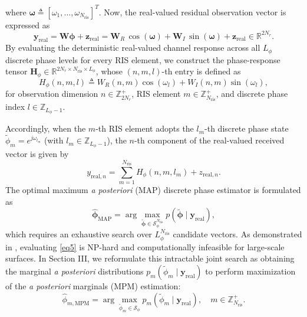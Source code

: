 \documentclass[conference]{IEEEtran}
\begin{document}
where $\boldsymbol{\omega} \triangleq [\omega_1, \dots, \omega_{N_{\mathrm{ris}}}]^T$. Now, the real-valued residual observation vector is expressed as
\begin{equation}
	\mathbf{y}_{\mathrm{real}} = \mathbf{W}\boldsymbol{\phi} + \mathbf{z}_{\mathrm{real}} = \mathbf{W}_R\,\cos(\boldsymbol{\omega}) + \mathbf{W}_I\,\sin(\boldsymbol{\omega}) + \mathbf{z}_{\mathrm{real}} \in \mathbb{R}^{2N_r}.
\end{equation}
By evaluating the deterministic real-valued channel response across all $L_{\phi}$ discrete phase levels for every RIS element, we construct the phase-response tensor $\mathbf{H}_{\phi} \in \mathbb{R}^{2N_r \times N_{\mathrm{ris}} \times L_{\phi}}$, whose $(n, m, l)$-th entry is defined as
\begin{equation}
	H_{\phi}(n, m, l) \triangleq W_R(n, m)\cos(\omega_l) + W_I(n, m)\sin(\omega_l), \label{eq4}
\end{equation}
for observation dimension $n \in \mathbb{Z}_{2N_r}^+$, RIS element $m \in \mathbb{Z}_{N_{\mathrm{ris}}}^+$, and discrete phase index $l \in \mathbb{Z}_{L_{\phi}-1}$.

Accordingly, when the $m$-th RIS element adopts the $l_m$-th discrete phase state $\tilde{\phi}_m = e^{j\omega_{l_m}}$ (with $l_m \in \mathbb{Z}_{L_{\phi}-1}$), the $n$-th component of the real-valued received vector is given by
\begin{equation}
	y_{\mathrm{real},n} = \sum_{m=1}^{N_{\mathrm{ris}}} H_{\phi}(n, m, l_m) + z_{\mathrm{real},n}.
\end{equation}
The optimal maximum \textit{a posteriori} (MAP) discrete phase estimator is formulated as
\begin{equation}
	\hat{\boldsymbol{\phi}}_{\mathrm{MAP}} = \arg\max_{\tilde{\boldsymbol{\phi}} \in \mathcal{S}_{\phi}^{N_{\mathrm{ris}}}} p(\tilde{\boldsymbol{\phi}} \mid \mathbf{y}_{\mathrm{real}}), \label{eq5}
\end{equation}
which requires an exhaustive search over $L_{\phi}^{N_{\mathrm{ris}}}$ candidate vectors. As demonstrated in \cite{b1,b10}, evaluating \eqref{eq5} is NP-hard and computationally infeasible for large-scale surfaces. In Section III, we reformulate this intractable joint search as obtaining the marginal \textit{a posteriori} distributions $p_m(\tilde{\phi}_m \mid \mathbf{y}_{\mathrm{real}})$ to perform maximization of the \textit{a posteriori} marginals (MPM) estimation:
\begin{equation}
	\hat{\phi}_{m,\mathrm{MPM}} = \arg\max_{\tilde{\phi}_m \in \mathcal{S}_{\phi}} p_m(\tilde{\phi}_m \mid \mathbf{y}_{\mathrm{real}}), \quad m \in \mathbb{Z}_{N_{\mathrm{ris}}}^+.
\end{equation}
	
\end{document}
